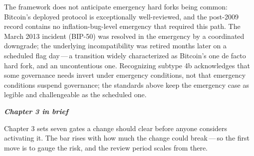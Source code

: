 \documentclass[11pt, twoside, openright]{book}
\newcommand{\peheader}[1]{{\itshape\bfseries #1}\par\vspace{4pt}}
\begin{document}
The framework does not anticipate emergency hard forks being common: Bitcoin's deployed protocol is exceptionally well-reviewed, and the post-2009 record contains no inflation-bug-level emergency that required this path. The March 2013 incident (BIP-50) was resolved in the emergency by a coordinated downgrade; the underlying incompatibility was retired months later on a scheduled flag day\,---\,a transition widely characterized as Bitcoin's one de facto hard fork, and an uncontentious one. Recognizing subtype 4b acknowledges that some governance needs invert under emergency conditions, not that emergency conditions suspend governance; the standards above keep the emergency case as legible and challengeable as the scheduled one.

\needspace{5in}
\begin{plainenglish}
\peheader{Chapter 3 in brief}

Chapter 3 sets seven gates a change should clear before anyone considers activating it. The bar rises with how much the change could break\,---\,so the first move is to gauge the risk, and the review period scales from there.


\end{plainenglish}
\end{document}
